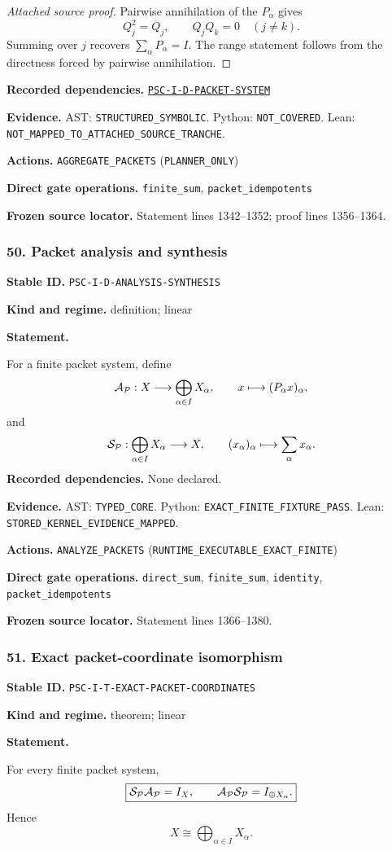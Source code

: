 \documentclass[a4paper,11pt]{article}
\newcommand{\field}[2]{\noindent\textbf{#1.} #2\par}
\begin{document}
\begin{proof}[Attached source proof]
Pairwise annihilation of the $P_\alpha$ gives
\[
Q_j^2=Q_j,
\qquad
Q_jQ_k=0\quad(j\neq k).
\]
Summing over $j$ recovers $\sum_\alpha P_\alpha=I$.  The range statement follows from the directness forced by pairwise annihilation.
\end{proof}
\field{Recorded dependencies}{\hyperref[rec:PSC-I-D-PACKET-SYSTEM]{\nolinkurl{PSC-I-D-PACKET-SYSTEM}}}
\field{Evidence}{AST: \nolinkurl{STRUCTURED_SYMBOLIC}. Python: \nolinkurl{NOT_COVERED}. Lean: \nolinkurl{NOT_MAPPED_TO_ATTACHED_SOURCE_TRANCHE}.}
\field{Actions}{\nolinkurl{AGGREGATE_PACKETS} (\nolinkurl{PLANNER_ONLY})}
\field{Direct gate operations}{\nolinkurl{finite_sum}, \nolinkurl{packet_idempotents}}
\field{Frozen source locator}{Statement lines 1342--1352; proof lines 1356--1364.}
\subsubsection*{50. Packet analysis and synthesis}
\label{rec:PSC-I-D-ANALYSIS-SYNTHESIS}
\field{Stable ID}{\nolinkurl{PSC-I-D-ANALYSIS-SYNTHESIS}}
\field{Kind and regime}{definition; linear}
\textbf{Statement.}\par
For a finite packet system, define
\[
\mathcal A_{\mathcal P}:X\longrightarrow\bigoplus_{\alpha\in I}X_\alpha,
\qquad
x\longmapsto(P_\alpha x)_\alpha,
\]
and
\[
\mathcal S_{\mathcal P}:\bigoplus_{\alpha\in I}X_\alpha\longrightarrow X,
\qquad
(x_\alpha)_\alpha\longmapsto\sum_\alpha x_\alpha.
\]
\field{Recorded dependencies}{None declared.}
\field{Evidence}{AST: \nolinkurl{TYPED_CORE}. Python: \nolinkurl{EXACT_FINITE_FIXTURE_PASS}. Lean: \nolinkurl{STORED_KERNEL_EVIDENCE_MAPPED}.}
\field{Actions}{\nolinkurl{ANALYZE_PACKETS} (\nolinkurl{RUNTIME_EXECUTABLE_EXACT_FINITE})}
\field{Direct gate operations}{\nolinkurl{direct_sum}, \nolinkurl{finite_sum}, \nolinkurl{identity}, \nolinkurl{packet_idempotents}}
\field{Frozen source locator}{Statement lines 1366--1380.}
\subsubsection*{51. Exact packet-coordinate isomorphism}
\label{rec:PSC-I-T-EXACT-PACKET-COORDINATES}
\field{Stable ID}{\nolinkurl{PSC-I-T-EXACT-PACKET-COORDINATES}}
\field{Kind and regime}{theorem; linear}
\textbf{Statement.}\par
For every finite packet system,
\[
\boxed{
\mathcal S_{\mathcal P}\mathcal A_{\mathcal P}=I_X,
\qquad
\mathcal A_{\mathcal P}\mathcal S_{\mathcal P}=I_{\oplus X_\alpha}.
}
\]
Hence
\[
\boxed{X\cong\bigoplus_{\alpha\in I}X_\alpha.}
\]
\end{document}
